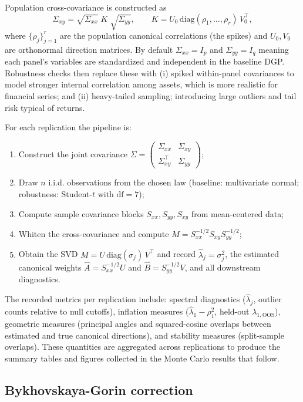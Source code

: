 \documentclass[12pt]{report} %
\begin{document}
Population cross-covariance is constructed as
\[ \Sigma_{xy} = \sqrt{\Sigma_{xx}}\;K\;\sqrt{\Sigma_{yy}}, \qquad K = U_0\,\mathrm{diag}(\rho_1,\ldots,\rho_r)\,V_0^\top, \]
where $\{\rho_j\}_{j=1}^r$ are the population canonical correlations (the spikes) and $U_0, V_0$ are orthonormal
direction matrices. By default $\Sigma_{xx}=I_p$ and $\Sigma_{yy}=I_q$ meaning each panel's variables are 
standardized and independent in the baseline DGP. Robustness checks then replace these with
(i) spiked within-panel covariances to model stronger internal correlation among assets, which is more
realistic for financial series; and (ii) heavy-tailed sampling; introducing large outliers and tail 
risk typical of returns.

\clearpage
For each replication the pipeline is:
\begin{enumerate}
	\item Construct the joint covariance $\Sigma=\begin{pmatrix}\Sigma_{xx} & \Sigma_{xy}\\[2pt] \Sigma_{xy}^\top & \Sigma_{yy}\end{pmatrix}$;
	\item Draw $n$ i.i.d. observations from the chosen law (baseline: multivariate normal; robustness: Student-$t$ with $\mathrm{df}=7$);
	\item Compute sample covariance blocks $S_{xx},S_{yy},S_{xy}$ from mean-centered data;
	\item Whiten the cross-covariance and compute $M = S_{xx}^{-1/2} S_{xy} S_{yy}^{-1/2}$;
	\item Obtain the SVD $M=U\,\mathrm{diag}(\sigma_j)\,V^\top$ and record $\widehat{\lambda}_j=\sigma_j^2$, the estimated
		canonical weights $\widehat{A}=S_{xx}^{-1/2}U$ and $\widehat{B}=S_{yy}^{-1/2}V$, and all downstream diagnostics.
\end{enumerate}

The recorded metrics per replication include: spectral diagnostics ($\widehat{\lambda}_j$, outlier counts relative to
null cutoffs), inflation measures ($\widehat{\lambda}_1-\rho_1^2$, held-out $\lambda_{1,\mathrm{OOS}}$), geometric
measures (principal angles and squared-cosine overlaps between estimated and true canonical directions), and stability
measures (split-sample overlaps). These quantities are aggregated across replications to produce the summary tables and
figures collected in the Monte Carlo results that follow.

\subsection*{Bykhovskaya-Gorin correction}
\end{document}
